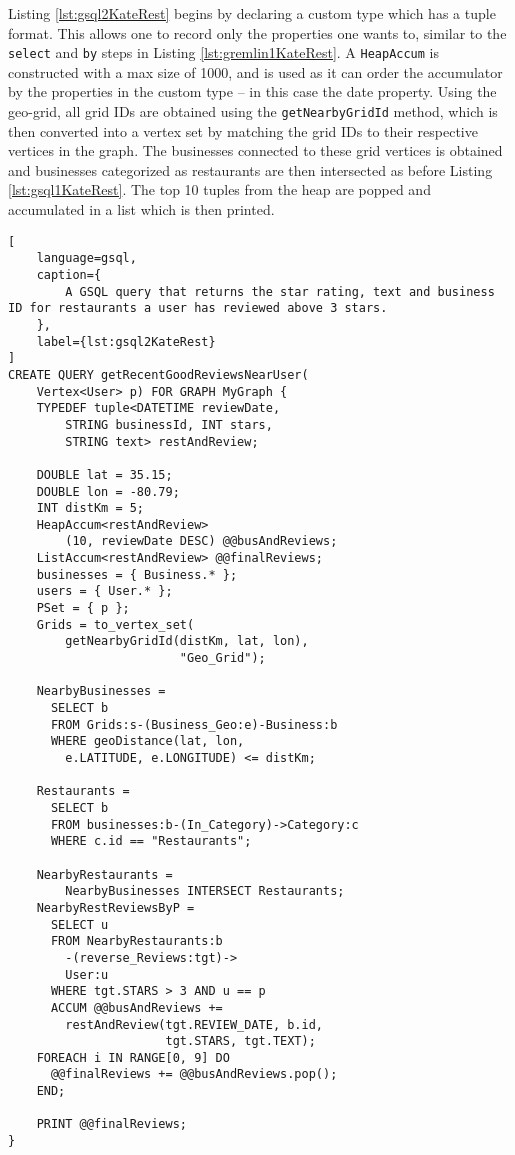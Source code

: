 Listing \ref{lst:gsql2KateRest} begins by declaring a custom type which has a tuple format. This allows one to record only the properties one wants to, similar to the \texttt{select} and \texttt{by} steps in Listing \ref{lst:gremlin1KateRest}. A \texttt{HeapAccum} is constructed with a max size of 1000, and is used as it can order the accumulator by the properties in the custom type -- in this case the date property. Using the geo-grid, all grid IDs are obtained using the \texttt{getNearbyGridId} method, which is then converted into a vertex set by matching the grid IDs to their respective vertices in the graph. The businesses connected to these grid vertices is obtained and businesses categorized as restaurants are then intersected as before Listing \ref{lst:gsql1KateRest}. The top 10 tuples from the heap are popped and accumulated in a list which is then printed.

\begin{lstlisting}[
    language=gsql,
    caption={
        A GSQL query that returns the star rating, text and business ID for restaurants a user has reviewed above 3 stars.
    },
    label={lst:gsql2KateRest}
]
CREATE QUERY getRecentGoodReviewsNearUser(
    Vertex<User> p) FOR GRAPH MyGraph {
    TYPEDEF tuple<DATETIME reviewDate,
        STRING businessId, INT stars,
        STRING text> restAndReview;
	
    DOUBLE lat = 35.15;
    DOUBLE lon = -80.79;
    INT distKm = 5;
    HeapAccum<restAndReview>
        (10, reviewDate DESC) @@busAndReviews;
    ListAccum<restAndReview> @@finalReviews;
    businesses = { Business.* };
    users = { User.* };
    PSet = { p };
    Grids = to_vertex_set(
        getNearbyGridId(distKm, lat, lon),
                        "Geo_Grid");
	
	NearbyBusinesses =
	  SELECT b
	  FROM Grids:s-(Business_Geo:e)-Business:b 
	  WHERE geoDistance(lat, lon,
	    e.LATITUDE, e.LONGITUDE) <= distKm;
	
	Restaurants =
	  SELECT b
	  FROM businesses:b-(In_Category)->Category:c
	  WHERE c.id == "Restaurants";
	
	NearbyRestaurants =
	    NearbyBusinesses INTERSECT Restaurants;
	NearbyRestReviewsByP =
	  SELECT u
	  FROM NearbyRestaurants:b
	    -(reverse_Reviews:tgt)->
	    User:u
	  WHERE tgt.STARS > 3 AND u == p
	  ACCUM @@busAndReviews +=
	    restAndReview(tgt.REVIEW_DATE, b.id,
	                  tgt.STARS, tgt.TEXT);
	FOREACH i IN RANGE[0, 9] DO
	  @@finalReviews += @@busAndReviews.pop();
	END;
	
	PRINT @@finalReviews;
}
\end{lstlisting}

